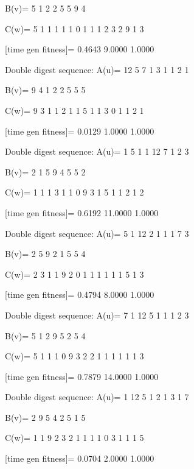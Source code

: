 B(v)=
     5     1     2     2     5     5     9     4

C(w)=
     5     1     1     1     1     1     0     1     1     1     2     3     2     9     1     3

[time gen fitness]=
    0.4643    9.0000    1.0000

Double digest sequence:
A(u)=
    12     5     7     1     3     1     1     2     1

B(v)=
     9     4     1     2     2     5     5     5

C(w)=
     9     3     1     1     2     1     1     5     1     1     3     0     1     1     2     1

[time gen fitness]=
    0.0129    1.0000    1.0000

Double digest sequence:
A(u)=
     1     5     1     1    12     7     1     2     3

B(v)=
     2     1     5     9     4     5     5     2

C(w)=
     1     1     1     3     1     1     0     9     3     1     5     1     1     2     1     2

[time gen fitness]=
    0.6192   11.0000    1.0000

Double digest sequence:
A(u)=
     5     1    12     2     1     1     1     7     3

B(v)=
     2     5     9     2     1     5     5     4

C(w)=
     2     3     1     1     9     2     0     1     1     1     1     1     1     5     1     3

[time gen fitness]=
    0.4794    8.0000    1.0000

Double digest sequence:
A(u)=
     7     1    12     5     1     1     1     2     3

B(v)=
     5     1     2     9     5     2     5     4

C(w)=
     5     1     1     1     0     9     3     2     2     1     1     1     1     1     1     3

[time gen fitness]=
    0.7879   14.0000    1.0000

Double digest sequence:
A(u)=
     1    12     5     1     2     1     3     1     7

B(v)=
     2     9     5     4     2     5     1     5

C(w)=
     1     1     9     2     3     2     1     1     1     1     0     3     1     1     1     5

[time gen fitness]=
    0.0704    2.0000    1.0000

